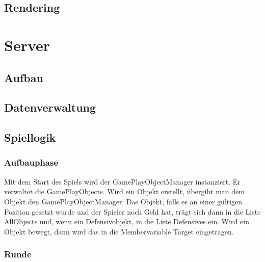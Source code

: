 \documentclass[ngerman, 12pt, pdftex]{scrartcl}[2006/07/30]
\begin{document}
\subsection{Rendering}


\section{Server}


\subsection{Aufbau}
\subsection{Datenverwaltung}


\subsection{Spiellogik}
\subsubsection{Aufbauphase}
Mit dem Start des Spiels wird der GamePlayObjectManager instanziert. Er verwaltet die GamePlayObjects.
Wird ein Objekt erstellt, \"{u}bergibt man dem Objekt den GamePlayObjectManager. Das Objekt, falls es an einer g\"{u}ltigen Position gesetzt wurde und der Spieler noch Geld hat, tr\"{a}gt sich dann in die Liste AllObjects und, wenn ein Defensivobjekt, in die Liste Defensives ein. Wird ein Objekt bewegt, dann wird das in die Membervariable Target eingetragen.

\subsubsection{Runde}
\end{document}
